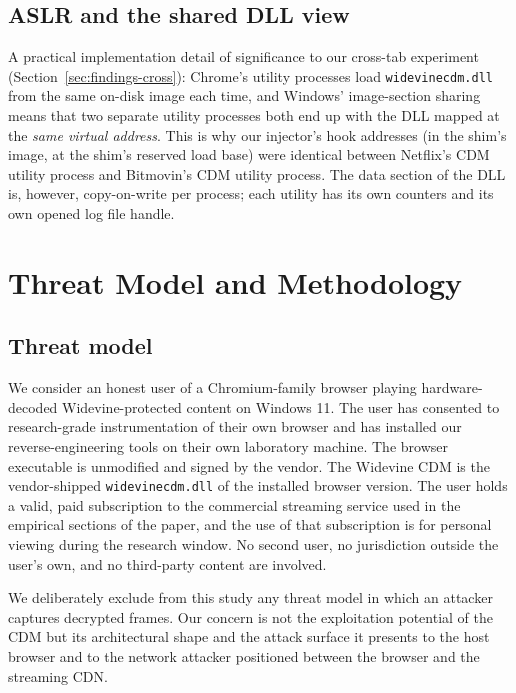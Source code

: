 \documentclass[11pt,letterpaper]{article}
\begin{document}
\subsection{ASLR and the shared DLL view}
\label{sec:bg-aslr}

A practical implementation detail of significance to our cross-tab
experiment (Section~\ref{sec:findings-cross}): Chrome's utility
processes load \texttt{widevinecdm.dll} from the same on-disk image
each time, and Windows' image-section sharing means that two
separate utility processes both end up with the DLL mapped at the
\emph{same virtual address}. This is why our injector's hook
addresses (in the shim's image, at the shim's reserved load base)
were identical between Netflix's CDM utility process and Bitmovin's
CDM utility process. The data section of the DLL is, however,
copy-on-write per process; each utility has its own counters and
its own opened log file handle.

\section{Threat Model and Methodology}
\label{sec:threat}

\subsection{Threat model}
\label{sec:threat-model}

We consider an honest user of a Chromium-family browser playing
hardware-decoded Widevine-protected content on Windows 11. The user
has consented to research-grade instrumentation of their own browser
and has installed our reverse-engineering tools on their own
laboratory machine. The browser executable is unmodified and signed
by the vendor. The Widevine CDM is the vendor-shipped
\texttt{widevinecdm.dll} of the installed browser version. The user
holds a valid, paid subscription to the commercial streaming
service used in the empirical sections of the paper, and the use
of that subscription is for personal viewing during the research
window. No second user, no jurisdiction outside the user's own, and
no third-party content are involved.

We deliberately exclude from this study any threat model in which
an attacker captures decrypted frames. Our concern is not the
exploitation potential of the CDM but its architectural shape and
the attack surface it presents to the host browser and to the
network attacker positioned between the browser and the streaming
CDN.
\end{document}
